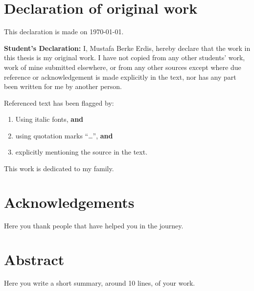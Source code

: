 \documentclass[12pt, oneside]{book}
\theoremstyle{plain}
\theoremstyle{definition}
\begin{document}
\chapter*{Declaration of original work}
\begin{flushright}
This declaration is made on \today.
\end{flushright}


{\bf Student's Declaration:}
I, Mustafa Berke Erdis, hereby declare that the work in this thesis 
is my original work. I have not copied from any other students' work, work of 
mine submitted elsewhere,  or from any other sources except where due reference or acknowledgement is made explicitly in the text, nor has any part been written for me by another person.

Referenced text has been flagged by:
\begin{enumerate}
\item Using italic fonts, {\bf and} %
\item using quotation marks ``\ldots '', {\bf and}
\item explicitly mentioning the source in the text.
\end{enumerate}


\newpage

\thispagestyle{empty}
        \begin{flushright}
                This work is dedicated to my family.
        \end{flushright}
\null



\chapter*{Acknowledgements}
Here you thank people that have helped you in the journey. \\
\lipsum[100] %

\chapter*{Abstract}
\begin{center}
\small 
Here you write a short summary, around 10 lines, of your work. \\
\lipsum[100]%
\end{center}       
\end{document}
